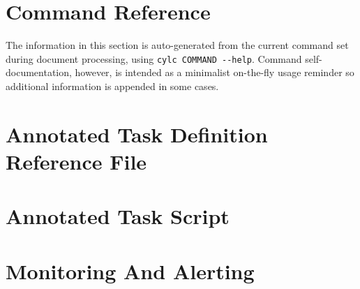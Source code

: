 \documentclass[11pt,a4paper]{article}
\begin{document}
\lstset{language=}


%

\pagebreak
\section{Command Reference}
\label{CommandReference}

The information in this section is auto-generated from
the current command set during document processing, using  
\lstinline=cylc COMMAND --help=. 
Command self-documentation, however, is intended as a minimalist
on-the-fly usage reminder so additional information is appended in
some cases.
  
\lstset{language=usage}



\pagebreak
\section{Annotated Task Definition Reference File}
\label{AnnotatedTaskDefinitionReferenceFile}

\lstset{language=cylctaskdef}



\lstset{language=}

\pagebreak
\section{Annotated Task Script}
\label{AnnotatedTaskScript}



\lstset{language=bash}



\pagebreak
\appendix

\section{Monitoring And Alerting}
\label{SystemMonitor}
\end{document}
